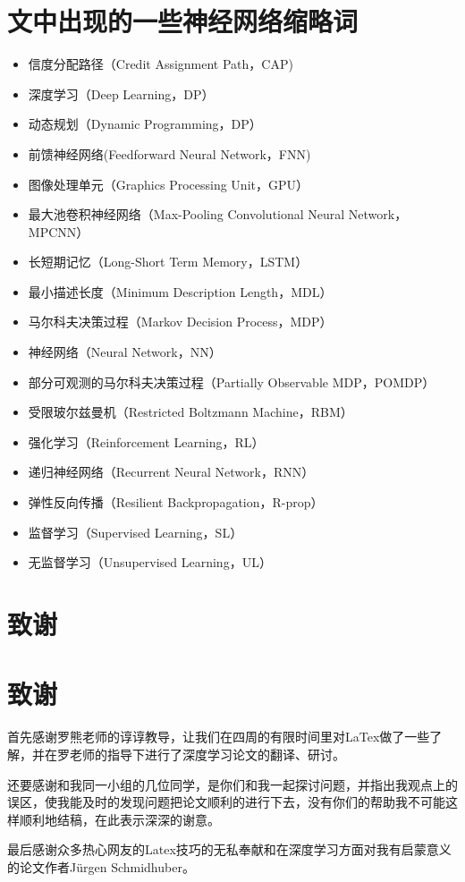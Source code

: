 \documentclass[10pt,journal,compsoc]{IEEEtran}
\begin{document}
\section{文中出现的一些神经网络缩略词}
\begin{itemize}
\item 信度分配路径（Credit Assignment Path，CAP)
\item 深度学习（Deep Learning，DP）
\item 动态规划（Dynamic Programming，DP）
\item 前馈神经网络(Feedforward Neural Network，FNN)
\item 图像处理单元（Graphics Processing Unit，GPU）
\item 最大池卷积神经网络（Max-Pooling Convolutional Neural Network，MPCNN）
\item 长短期记忆（Long-Short Term Memory，LSTM）
\item 最小描述长度（Minimum Description Length，MDL）
\item 马尔科夫决策过程（Markov Decision Process，MDP）
\item 神经网络（Neural Network，NN）
\item 部分可观测的马尔科夫决策过程（Partially Observable MDP，POMDP）
\item 受限玻尔兹曼机（Restricted Boltzmann Machine，RBM）
\item 强化学习（Reinforcement Learning，RL）
\item 递归神经网络（Recurrent Neural Network，RNN）
\item 弹性反向传播（Resilient Backpropagation，R-prop）
\item 监督学习（Supervised Learning，SL）
\item 无监督学习（Unsupervised Learning，UL）
\end{itemize}



\newpage
\ifCLASSOPTIONcompsoc
  \section*{致谢}
\else
  \section*{致谢}
\fi
首先感谢罗熊老师的谆谆教导，让我们在四周的有限时间里对LaTex做了一些了解，并在罗老师的指导下进行了深度学习论文的翻译、研讨。\par
还要感谢和我同一小组的几位同学，是你们和我一起探讨问题，并指出我观点上的误区，使我能及时的发现问题把论文顺利的进行下去，没有你们的帮助我不可能这样顺利地结稿，在此表示深深的谢意。\par
最后感谢众多热心网友的Latex技巧的无私奉献和在深度学习方面对我有启蒙意义的论文作者Jürgen Schmidhuber。
\end{document}
